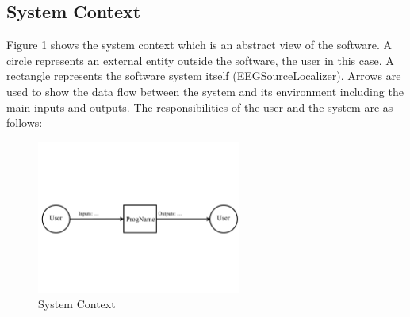 \documentclass[12pt]{article}
\begin{document}
\subsection{System Context}


Figure 1 shows the system context which is an abstract view of the software. A circle represents an external entity outside the software, the user in this case. A rectangle represents the software system itself (EEGSourceLocalizer). Arrows are used to show the data flow between the system and its environment including the main inputs and outputs. The responsibilities of the user and the system are as follows:


\begin{figure}[h!]
\begin{center}
 \includegraphics[width=0.6\textwidth]{SystemContextFigure}
\caption{System Context}
\label{Fig_SystemContext} 
\end{center}
\end{figure}

\end{document}
